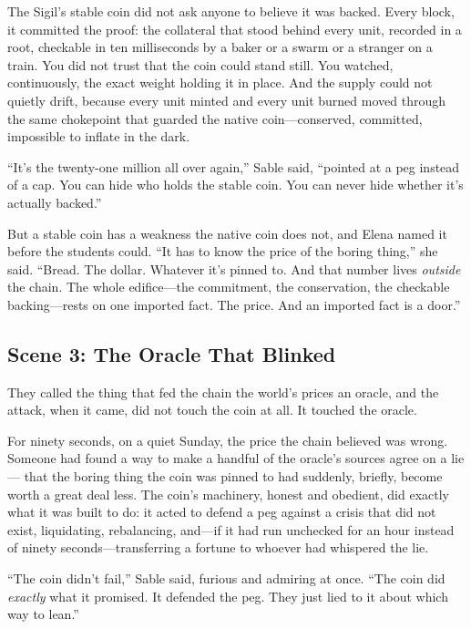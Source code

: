 \documentclass[12pt,letterpaper]{book}
\begin{document}
The Sigil's stable coin did not ask anyone to believe it was backed. Every block,
it committed the proof: the collateral that stood behind every unit, recorded in a
root, checkable in ten milliseconds by a baker or a swarm or a stranger on a train.
You did not trust that the coin could stand still. You watched, continuously, the
exact weight holding it in place. And the supply could not quietly drift, because
every unit minted and every unit burned moved through the same chokepoint that
guarded the native coin---conserved, committed, impossible to inflate in the dark.

``It's the twenty-one million all over again,'' Sable said, ``pointed at a peg
instead of a cap. You can hide who holds the stable coin. You can never hide whether
it's actually backed.''

But a stable coin has a weakness the native coin does not, and Elena named it
before the students could. ``It has to know the price of the boring thing,'' she
said. ``Bread. The dollar. Whatever it's pinned to. And that number lives
\emph{outside} the chain. The whole edifice---the commitment, the conservation, the
checkable backing---rests on one imported fact. The price. And an imported fact is a
door.''

\hypertarget{scene-3-the-oracle-that-blinked}{%
\subsection{Scene 3: The Oracle That
Blinked}\label{scene-3-the-oracle-that-blinked}}

They called the thing that fed the chain the world's prices an oracle, and the
attack, when it came, did not touch the coin at all. It touched the oracle.

For ninety seconds, on a quiet Sunday, the price the chain believed was wrong.
Someone had found a way to make a handful of the oracle's sources agree on a lie---
that the boring thing the coin was pinned to had suddenly, briefly, become worth a
great deal less. The coin's machinery, honest and obedient, did exactly what it was
built to do: it acted to defend a peg against a crisis that did not exist,
liquidating, rebalancing, and---if it had run unchecked for an hour instead of
ninety seconds---transferring a fortune to whoever had whispered the lie.

``The coin didn't fail,'' Sable said, furious and admiring at once. ``The coin did
\emph{exactly} what it promised. It defended the peg. They just lied to it about
which way to lean.''
\end{document}
